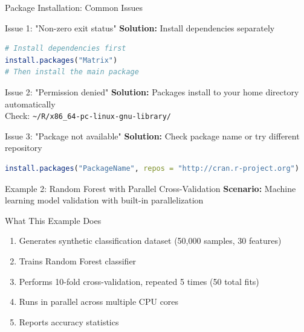 \documentclass[aspectratio=169]{beamer}
\begin{document}
\begin{frame}[fragile]{Package Installation: Common Issues}
\begin{alertblock}{Issue 1: "Non-zero exit status"}
\textbf{Solution:} Install dependencies separately
\begin{lstlisting}[language=R]
# Install dependencies first
install.packages("Matrix")
# Then install the main package
\end{lstlisting}
\end{alertblock}

\begin{alertblock}{Issue 2: "Permission denied"}
\textbf{Solution:} Packages install to your home directory automatically\\
Check: \texttt{\textasciitilde/R/x86\_64-pc-linux-gnu-library/}
\end{alertblock}

\begin{alertblock}{Issue 3: "Package not available"}
\textbf{Solution:} Check package name or try different repository
\begin{lstlisting}[language=R]
install.packages("PackageName", repos = "http://cran.r-project.org")
\end{lstlisting}
\end{alertblock}
\end{frame}


\begin{frame}{Example 2: Random Forest with Parallel Cross-Validation}
\textbf{Scenario:} Machine learning model validation with built-in parallelization

\begin{block}{What This Example Does}
\begin{enumerate}
    \item Generates synthetic classification dataset (50,000 samples, 30 features)
    \item Trains Random Forest classifier
    \item Performs 10-fold cross-validation, repeated 5 times (50 total fits)
    \item Runs in parallel across multiple CPU cores
    \item Reports accuracy statistics
\end{enumerate}
\end{block}
\end{frame}
\end{document}
